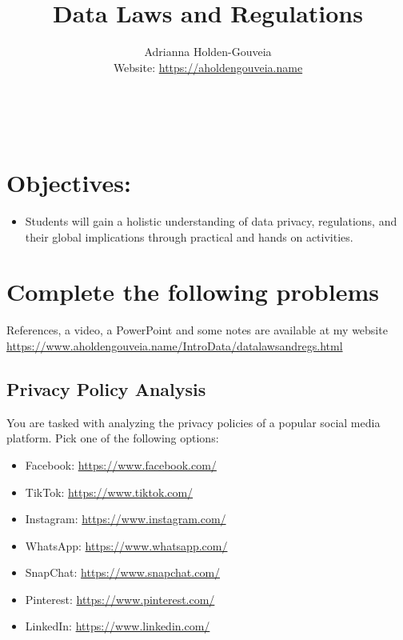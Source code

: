\documentclass[12pt]{article}
\title{Data Laws and Regulations}
\author{
        Adrianna Holden-Gouveia \\
        Website: \url{https://aholdengouveia.name}\\ 
        \date{\vspace{-5ex}}
        \faLinkedin{: aholdengouveia} \\
        \faGithub {: aholdengouveia} \\
        }
\begin{document}
    

\maketitle


\section*{Objectives:}
\begin{itemize}
    \item Students will gain a holistic understanding of data privacy, regulations, and their global implications through practical and hands on activities.
\end{itemize}
\section*{Complete the following problems}

References, a video, a PowerPoint and some notes are available at my website
\url {https://www.aholdengouveia.name/IntroData/datalawsandregs.html}


\subsection*{Privacy Policy Analysis}

You are tasked with analyzing the privacy policies of a popular social media platform.  Pick one of the following options: 
        \begin{itemize}
            \item Facebook: \url{https://www.facebook.com/}
            \item TikTok: \url{https://www.tiktok.com/}
            \item Instagram: \url{https://www.instagram.com/}
            \item WhatsApp: \url{https://www.whatsapp.com/}
            \item SnapChat: \url{https://www.snapchat.com/}
            \item Pinterest: \url{https://www.pinterest.com/}
            \item LinkedIn: \url{https://www.linkedin.com/}
    \end{itemize}
        
\end{document}
